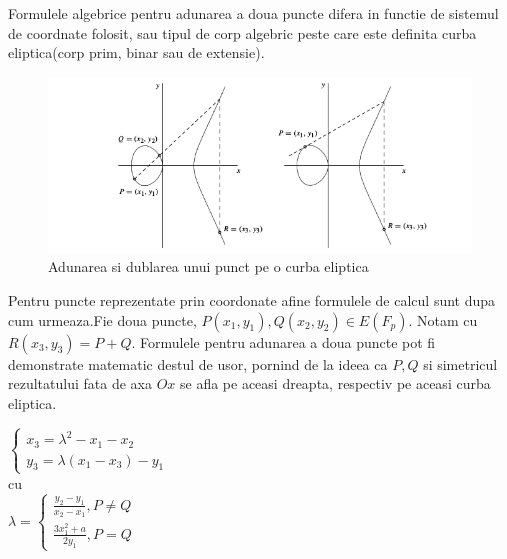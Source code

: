 \begin{obs}
Formulele algebrice pentru adunarea a doua puncte difera in functie de sistemul de coordnate folosit, sau tipul de corp algebric peste care este definita curba eliptica(corp prim, binar sau de extensie).
\end{obs}

\begin{figure}[htp]
\centering
\includegraphics[width=13cm]{chapters/Addition.png}
\caption{Adunarea si dublarea unui punct pe o curba eliptica}
\label{fig:lion}
\end{figure}

\begin{dfn}
Pentru puncte reprezentate prin coordonate afine formulele de calcul sunt dupa cum urmeaza.Fie doua puncte, $P(x_{1}, y_1), Q(x_2, y_2)\in E(F_p)$. Notam cu $R(x_3, y_3) = P + Q$. Formulele pentru adunarea a doua puncte pot fi demonstrate matematic destul de usor, pornind de la ideea ca $P, Q$ si simetricul rezultatului fata de axa $Ox$ se afla pe aceasi dreapta, respectiv pe aceasi curba eliptica.

$\begin{cases} 
    x_3 = \lambda^2 - x_1 - x_2 \\
    y_3 =  \lambda (x_1-x_3) - y_1
   \end{cases}$
 \\cu 
 \\$
 \lambda = 
 \begin{cases}
 \frac{y_2 - y_1}{x_2 - x_1}, P \neq Q \\ 
 \frac{3x^{2}_1 + a}{2y_1}, P = Q
 \end{cases}$ \\
\end{dfn}

